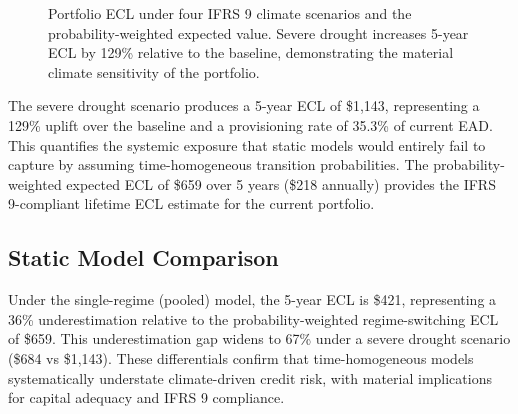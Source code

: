 \documentclass[12pt,a4paper]{article}
\begin{document}
\begin{figure}[H]
\centering
{}
\caption{Portfolio ECL under four IFRS 9 climate scenarios and the probability-weighted expected value. Severe drought increases 5-year ECL by 129\% relative to the baseline, demonstrating the material climate sensitivity of the portfolio.}
\label{fig:ecl_scenarios_ch4}
\end{figure}

The severe drought scenario produces a 5-year ECL of \$1,143, representing a 129\% uplift over the baseline and a provisioning rate of 35.3\% of current EAD. This quantifies the systemic exposure that static models would entirely fail to capture by assuming time-homogeneous transition probabilities. The probability-weighted expected ECL of \$659 over 5 years (\$218 annually) provides the IFRS 9-compliant lifetime ECL estimate for the current portfolio.

\subsection{Static Model Comparison}

Under the single-regime (pooled) model, the 5-year ECL is \$421, representing a 36\% underestimation relative to the probability-weighted regime-switching ECL of \$659. This underestimation gap widens to 67\% under a severe drought scenario (\$684 vs \$1,143). These differentials confirm that time-homogeneous models systematically understate climate-driven credit risk, with material implications for capital adequacy and IFRS 9 compliance.
\end{document}
